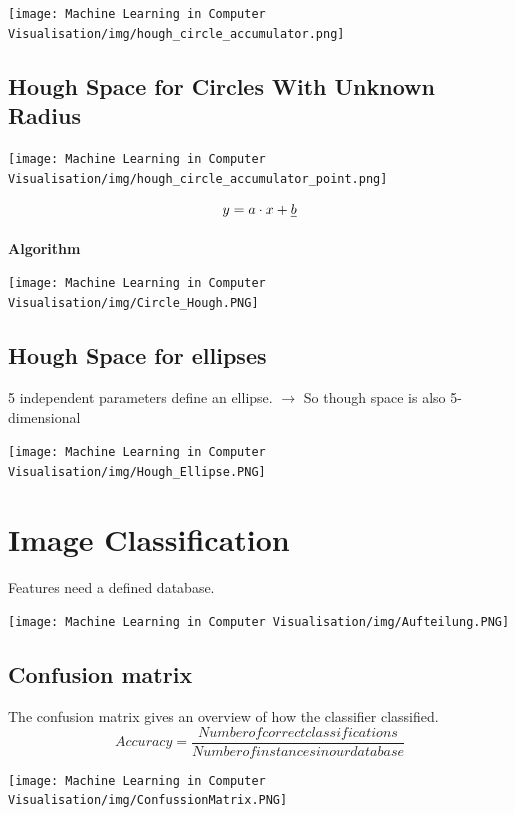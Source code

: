 \documentclass[x11names,11pt,a4paper]{article}
\theoremstyle{definition}
\begin{document}
\begin{center}
	\texttt{[image: Machine Learning in Computer Visualisation/img/hough\_circle\_accumulator.png]}
\end{center}

\subsection{Hough Space for Circles With Unknown Radius}

\begin{center}
	\texttt{[image: Machine Learning in Computer Visualisation/img/hough\_circle\_accumulator\_point.png]}
\end{center}

\begin{equation*}
	y = a\cdot x + \sout{b}
\end{equation*}


\textbf{Algorithm}
\begin{center}
	\texttt{[image: Machine Learning in Computer Visualisation/img/Circle\_Hough.PNG]}
\end{center}

\subsection{Hough Space for ellipses}
5 independent parameters define an ellipse. $\rightarrow$ So though space is also 5-dimensional
\begin{center}
	\texttt{[image: Machine Learning in Computer Visualisation/img/Hough\_Ellipse.PNG]}
\end{center}

\section{Image Classification}
Features need a defined database.
\begin{center}
	\texttt{[image: Machine Learning in Computer Visualisation/img/Aufteilung.PNG]}
\end{center}

\subsection{Confusion matrix}
The confusion matrix gives an overview of how the classifier classified.
\begin{equation}
    Accuracy = \frac{Number of correct classifications}{Number of instances in our database}
\end{equation}
\begin{center}
	\texttt{[image: Machine Learning in Computer Visualisation/img/ConfussionMatrix.PNG]}
\end{center}
\end{document}
